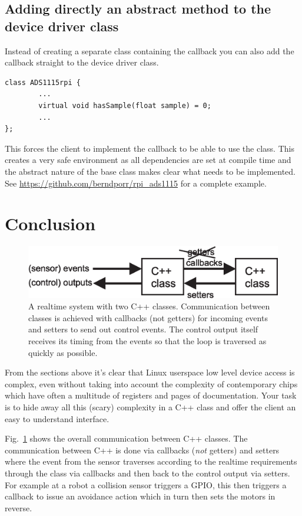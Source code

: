 \documentclass[12pt]{report}
\begin{document}
\subsection{Adding directly an abstract method to the device driver class}
Instead of creating a separate class containing the callback you
can also add the callback straight to the device driver class.
\begin{verbatim}
class ADS1115rpi {
        ...
        virtual void hasSample(float sample) = 0;
        ...
};
\end{verbatim}
This forces the client to implement the callback to be able to use
the class. This creates a very safe environment as all dependencies
are set at compile time and the abstract nature of the base class
makes clear what needs to be implemented.
See
\url{https://github.com/berndporr/rpi_ads1115} for a complete example.


\section{Conclusion}
\begin{figure}[!hbt]
\begin{center}
\mbox{\includegraphics[width=\textwidth]{gettersetters}}
\end{center}
\caption{A realtime system with two C++ classes. Communication
  between classes is achieved with callbacks (not getters) for incoming events
  and setters to send out control events. The control output itself
  receives its timing from the events so that the loop is traversed
  as quickly as possible.
\label{gettersetters}}
\end{figure}
From the sections above it's clear that Linux userspace low level
device access is complex, even without taking into account the
complexity of contemporary chips which have often a multitude of
registers and pages of documentation. Your task is to hide away
all this (scary) complexity in a C++ class and offer the client
an easy to understand interface.

Fig.~\ref{gettersetters} shows the overall communication between C++
classes.  The communication between C++ is done via callbacks
(\textsl{not} getters) and setters where the event from the sensor
  traverses according to the realtime requirements through the class
  via callbacks and then back to the control output via setters.  For
  example at a robot a collision sensor triggers a GPIO, this then
  triggers a callback to issue an avoidance action which in turn then
  sets the motors in reverse.
\end{document}
